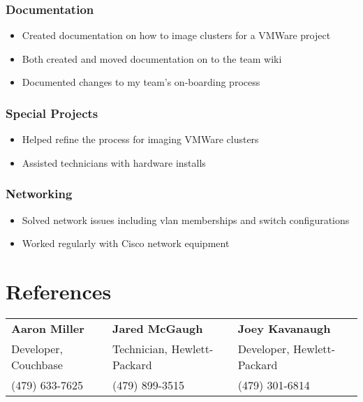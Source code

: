 \documentclass[10pt]{article}
\begin{document}
\subsubsection*{Documentation}
\begin{itemize}
    \item Created documentation on how to image clusters for a VMWare project
    \item Both created and moved documentation on to the team wiki
    \item Documented changes to my team's on-boarding process
\end{itemize}

\subsubsection*{Special Projects}
\begin{itemize}
    \item Helped refine the process for imaging VMWare clusters
    \item Assisted technicians with hardware installs
\end{itemize}

\subsubsection*{Networking}
\begin{itemize}
    \item Solved network issues including vlan memberships and switch configurations
    \item Worked regularly with Cisco network equipment
\end{itemize}

\section*{References}
\begin{tabular}{l l l}
\textbf{Aaron Miller} & \textbf{Jared McGaugh} & \textbf{Joey Kavanaugh} \\
Developer, Couchbase & Technician, Hewlett-Packard & Developer, Hewlett-Packard\\
(479) 633-7625 & (479) 899-3515 & (479) 301-6814\\
\end{tabular}
\end{document}
